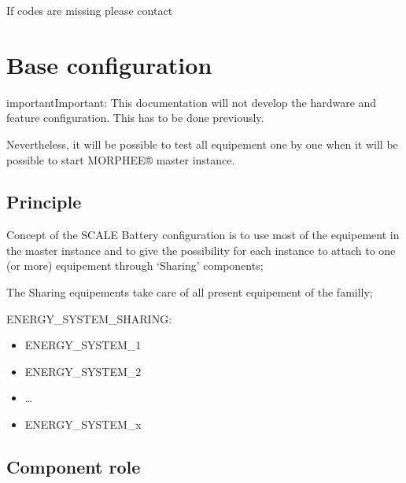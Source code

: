 \documentclass[letterpaper,10pt,english]{jupyterBook}
\begin{document}
\sphinxAtStartPar
If codes are missing please contact 


\chapter{Base configuration}
\label{\detokenize{04_Base-configuration:base-configuration}}\label{\detokenize{04_Base-configuration::doc}}
\begin{sphinxadmonition}{important}{Important:}
\sphinxAtStartPar
This documentation will not develop the hardware and feature configuration.
This has to be done previously.

\sphinxAtStartPar
Nevertheless, it will be possible to test all equipement one by one when it will be possible to start MORPHEE® master instance.
\end{sphinxadmonition}


\section{Principle}
\label{\detokenize{04_Base-configuration:principle}}
\sphinxAtStartPar
Concept of the SCALE Battery configuration is to use most of the equipement in the master instance and to give the possibility for each instance to attach to one (or more) equipement through ‘Sharing’ components;

\sphinxAtStartPar
{}

\sphinxAtStartPar
The Sharing equipements take care of all present equipement of the familly;

\sphinxAtStartPar
ENERGY\_SYSTEM\_SHARING:
\begin{itemize}
\item {} 
\sphinxAtStartPar
ENERGY\_SYSTEM\_1

\item {} 
\sphinxAtStartPar
ENERGY\_SYSTEM\_2

\item {} 
\sphinxAtStartPar
…

\item {} 
\sphinxAtStartPar
ENERGY\_SYSTEM\_x

\end{itemize}


\section{Component role}
\label{\detokenize{04_Base-configuration:component-role}}
\end{document}
